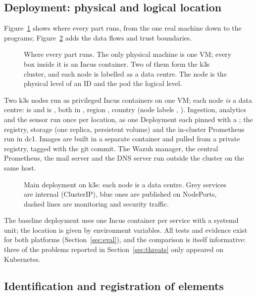 \subsection{Deployment: physical and logical location}

Figure~\ref{fig:layers} shows where every part runs, from the one real machine down to the
programs; Figure~\ref{fig:arch} adds the data flows and trust boundaries.

\begin{figure}[ht]
\centering
\resizebox{\textwidth}{!}{}
\caption{Where every part runs. The only physical machine is one VM; every box inside it is an
Incus container. Two of them form the k3s cluster, and each node is labelled as a data centre. The
node is the physical level of an ID and the pod the logical level.}
\label{fig:layers}
\end{figure}

Two k3s nodes run as privileged Incus containers on
one VM; each node \emph{is} a data centre:  is  and  is
, both in , region , country  (node labels
, ). Ingestion, analytics and the sensor run once per location, as one
Deployment each pinned with a ; the registry, storage (one replica, persistent
volume) and the in-cluster Prometheus run in dc1. Images are built in a separate container and
pulled from a private registry, tagged with the git commit. The Wazuh manager, the central
Prometheus, the mail server and the DNS server run outside the cluster on the same host.

\begin{figure}[ht]
\centering
\resizebox{\textwidth}{!}{}
\caption{Main deployment on k3s: each node is a data centre. Grey services are internal
(ClusterIP), blue ones are published on NodePorts, dashed lines are monitoring and security
traffic.}
\label{fig:arch}
\end{figure}

The baseline deployment uses one Incus container per service with a systemd unit; the location
is given by environment variables. All tests and evidence exist for both platforms
(Section~\ref{sec:eval}), and the comparison is itself informative: three of the problems reported
in Section~\ref{sec:threats} only appeared on Kubernetes.

\subsection{Identification and registration of elements}
\label{sec:naming}

